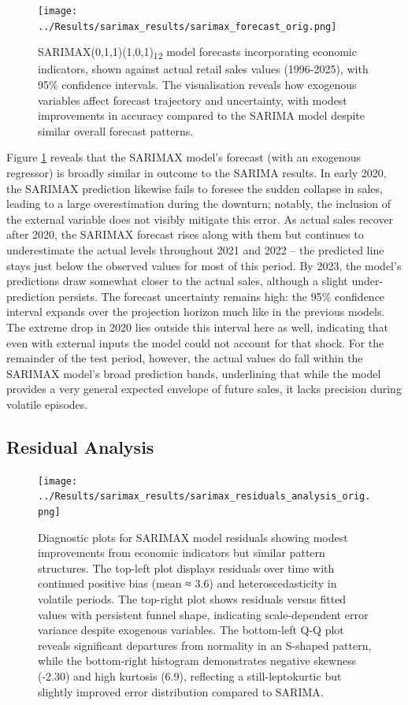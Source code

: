 \documentclass[12pt,a4paper]{report}
\begin{document}
\begin{figure}[htbp]
\centering
\texttt{[image: ../Results/sarimax\_results/sarimax\_forecast\_orig.png]}
\caption{SARIMAX(0,1,1)(1,0,1)\textsubscript{12} model forecasts incorporating economic indicators, shown against actual retail sales values (1996-2025), with 95\% confidence intervals. The visualisation reveals how exogenous variables affect forecast trajectory and uncertainty, with modest improvements in accuracy compared to the SARIMA model despite similar overall forecast patterns.}
\label{fig:sarimax_forecast}
\end{figure}

Figure \ref{fig:sarimax_forecast} reveals that the SARIMAX model's forecast (with an exogenous regressor) is broadly similar in outcome to the SARIMA results. In early 2020, the SARIMAX prediction likewise fails to foresee the sudden collapse in sales, leading to a large overestimation during the downturn; notably, the inclusion of the external variable does not visibly mitigate this error. As actual sales recover after 2020, the SARIMAX forecast rises along with them but continues to underestimate the actual levels throughout 2021 and 2022 – the predicted line stays just below the observed values for most of this period. By 2023, the model's predictions draw somewhat closer to the actual sales, although a slight under-prediction persists. The forecast uncertainty remains high: the 95\% confidence interval expands over the projection horizon much like in the previous models. The extreme drop in 2020 lies outside this interval here as well, indicating that even with external inputs the model could not account for that shock. For the remainder of the test period, however, the actual values do fall within the SARIMAX model's broad prediction bands, underlining that while the model provides a very general expected envelope of future sales, it lacks precision during volatile episodes.

\subsection{Residual Analysis}
\begin{figure}[htbp]
\centering
\texttt{[image: ../Results/sarimax\_results/sarimax\_residuals\_analysis\_orig.png]}
\caption{Diagnostic plots for SARIMAX model residuals showing modest improvements from economic indicators but similar pattern structures. The top-left plot displays residuals over time with continued positive bias (mean ≈ 3.6) and heteroscedasticity in volatile periods. The top-right plot shows residuals versus fitted values with persistent funnel shape, indicating scale-dependent error variance despite exogenous variables. The bottom-left Q-Q plot reveals significant departures from normality in an S-shaped pattern, while the bottom-right histogram demonstrates negative skewness (-2.30) and high kurtosis (6.9), reflecting a still-leptokurtic but slightly improved error distribution compared to SARIMA.}
\label{fig:sarimax_residuals}
\end{figure}
\end{document}
